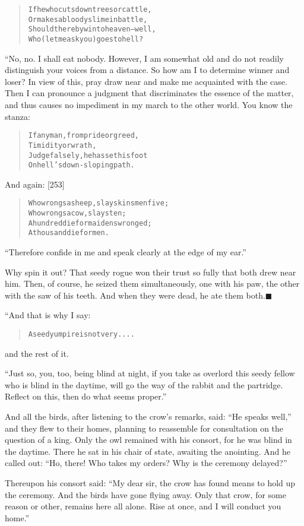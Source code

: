 \documentclass[article, twoside, 14pt]{memoir}
\newcommand{\qed}{\hfill \ensuremath{\blacksquare}}
\renewenvironment{verbatim}{%
\begin{quote}%
\vskip -10pt%
\begin{alltt}\normalfont\large}{\end{alltt}%
\end{quote}%
\vskip -10pt
} %
\begin{document}
\begin{verbatim}
If he who cuts down trees or cattle,
Or makes a bloody slime in battle,
Should thereby win to heaven--well,
Who (let me ask you) goes to hell?
\end{verbatim}
“No, no. I shall eat nobody. However, I am somewhat old and do not
readily distinguish your voices from a distance. So how am I to
determine winner and loser? In view of this, pray draw near and
make me acquainted with the case. Then I can pronounce a judgment
that discriminates the essence of the matter, and thus causes no
impediment in my march to the other world. You know the stanza:

\begin{verbatim}
If any man, from pride or greed,
    Timidity or wrath,
Judge falsely, he has set his foot
    On hell's down-sloping path.
\end{verbatim}
And again: [253]

\begin{verbatim}
Who wrongs a sheep, slays kinsmen five;
    Who wrongs a cow, slays ten;
A hundred die for maidens wronged;
    A thousand die for men.
\end{verbatim}
``Therefore confide in me and speak clearly at the edge of my ear.''

Why spin it out? That seedy rogue won their trust so fully that
both drew near him. Then, of course, he seized them simultaneously,
one with his paw, the other with the saw of his teeth. And when
they were dead, he ate them both.\hyperref[s50]{\qed}

“And that is why I say:

\begin{verbatim}
A seedy umpire is not very. . . .
\end{verbatim}
and the rest of it.

``Just so, you, too, being blind at night, if you take as overlord this seedy fellow who is blind in the daytime, will go the way of the rabbit and the partridge. Reflect on this, then do what seems proper.''

And all the birds, after listening to the crow's remarks, said:
``He speaks well,'' and they flew to their homes, planning to
reassemble for consultation on the question of a king. Only the owl
remained with his consort, for he was blind in the daytime. There
he sat in his chair of state, awaiting the anointing. And he called
out:
``Ho, there! Who takes my orders? Why is the ceremony delayed?''

Thereupon his consort said:
``My dear sir, the crow has found means to hold up the ceremony. And the birds have gone flying away. Only that crow, for some reason or other, remains here all alone. Rise at once, and I will conduct you home.''
\end{document}
